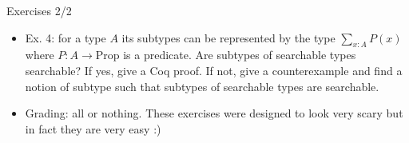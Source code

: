 \documentclass{beamer}
\begin{document}
\begin{frame}{Exercises 2/2}
\begin{itemize}
	\item Ex. 4: for a type $A$ its subtypes can be represented by the type $\displaystyle \sum_{x : A} P(x)$ where $P : A \to \text{Prop}$ is a predicate. Are subtypes of searchable types searchable? If yes, give a Coq proof. If not, give a counterexample and find a notion of subtype such that subtypes of searchable types are searchable.
	\item Grading: all or nothing. These exercises were designed to look very scary but in fact they are very easy :)
\end{itemize}
\end{frame}
\end{document}
